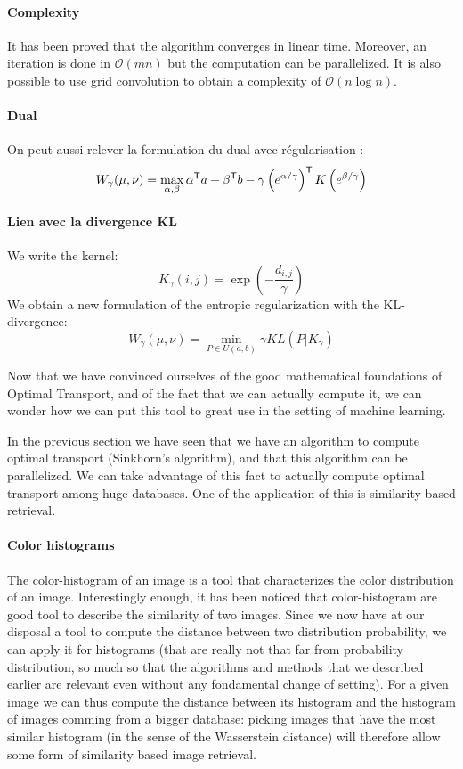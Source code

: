 \paragraph{Complexity}
It has been proved that the algorithm converges in linear time. Moreover,
an iteration is done in $\mathcal{O}(mn)$ but the computation can be
parallelized. It is also possible to use grid convolution to obtain a
complexity of $\mathcal{O}(n \log n)$.

\paragraph{Dual}
On peut aussi relever la formulation du dual avec régularisation :
$$ W_\gamma(\mu, \nu) = \max_{\alpha, \beta} \alpha^{\mathsf{T}} a + \beta^{\mathsf{T}} b - \gamma \left( e^{\alpha / \gamma} \right)^{\mathsf{T}} K \left( e^{\beta / \gamma} \right) $$

\paragraph{Lien avec la divergence KL}
We write the kernel:
$$ K_\gamma(i, j) = \exp \left( - \dfrac{d_{i, j}}{\gamma} \right) $$
We obtain a new formulation of the entropic regularization with the KL-divergence:
$$ W_\gamma(\mu, \nu) = \min_{P \in U(a, b)} \gamma KL(P | K_\gamma) $$


Now that we have convinced ourselves of the good mathematical foundations
of Optimal Transport, and of the fact that we can actually compute it, we
can wonder how we can put this tool to great use in the setting of machine
learning.


In the previous section we have seen that we have an algorithm to compute
optimal transport (Sinkhorn's algorithm), and that this algorithm can be
parallelized. We can take advantage of this fact to actually compute optimal
transport among huge databases. One of the application of this is similarity
based retrieval.

\paragraph{Color histograms}

The color-histogram of an image is a tool that characterizes the color
distribution of an image. Interestingly enough, it has been noticed that
color-histogram are good tool to describe the similarity of two images. Since
we now have at our disposal a tool to compute the distance between two
distribution probability, we can apply it for histograms (that are really not
that far from probability distribution, so much so that the algorithms and
methods that we described earlier are relevant even without any fondamental
change of setting). For a given image we can thus compute the distance between
its histogram and the histogram of images comming from a bigger database:
picking images that have the most similar histogram (in the sense of the
Wasserstein distance) will therefore allow some form of similarity based
image retrieval.

